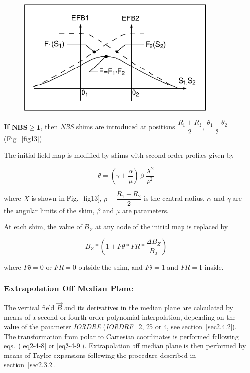{\vfill
\begin{figure}[H]
\centerline{\includegraphics[width=10cm]{Fig12.ps}}
{\setlength{\captionwidth}{13cm}
}
\end{figure}

\newpage


\noindent\textbf{If } $\mathbf{NBS \geq 1}$, then \textsl{NBS} shims are introduced at
positions $ \dfrac{R_1+R_2 }{ 2}$, $\dfrac{\theta_ 1+\theta_ 2 }{ 2} $  
(Fig.~\ref{fig13})~\cite{Biblio13}  %

\noindent The initial field map is modified by shims with second order
profiles given by 

$$ \theta  = \left(\gamma  + \dfrac{\alpha }{ \mu} \right) 
       \,\beta  \, \dfrac{X^2 }{\rho^ 2} $$

\noindent  where $ X $ is shown in  Fig.~\ref{fig13},  
 $ \rho =\dfrac{R_1+R_2 }{ 2}$ is 
the central radius, $\alpha$ and $\gamma$ are the angular limits of the shim, 
$\beta$ and $\mu$ are parameters. 

\noindent At each shim, the value of $ B_Z $ at any node of the initial map is
replaced by 

$$ B_Z \ast  \left(1+F\theta  \ast  FR \ast  \dfrac{\Delta B_Z }{ B_0} \right)$$

\noindent  where $ F\theta =0 $ or $ FR=0 $ outside the shim, and $ F\theta =1$ and $ FR=1 $ inside.  

\subsubsection*{Extrapolation Off Median Plane} 

The vertical field $ \vec  B $ and its derivatives in the median plane are 
calculated by means of a second or fourth order polynomial 
interpolation, depending 
on the value of the parameter \textsl{IORDRE} (\textsl{IORDRE}=2, 25 or 4, 
see section~\ref{sec2.4.2}). 
The transformation from polar to Cartesian coordinates is performed 
following eqs.~(\ref{eq2-4-8} or \ref{eq2-4-9}). Extrapolation off median plane is then performed 
by means of Taylor expansions following the procedure described in section~\ref{sec2.3.2}.  


}
